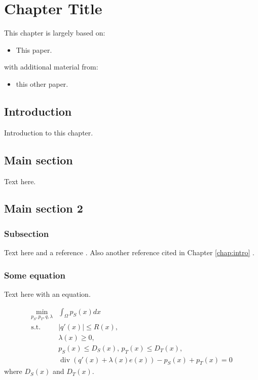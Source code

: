 \chapter{Chapter Title}\label{chap:example}

This chapter is largely based on:
\begin{itemize}[noitemsep,topsep=0pt]
	\item This paper.
\end{itemize}
with additional material from:
\begin{itemize}[noitemsep,topsep=0pt]
	\item this other paper.
\end{itemize}

\section{Introduction}
Introduction to this chapter.

\section{Main section}

Text here.

\section{Main section 2}
\subsection{Subsection}

Text here and a reference \cite{Author2018}. Also another reference cited in Chapter \ref{chap:intro} \cite{Author1990}.

\subsection{Some equation}

Text here with an equation.

\begin{equation}
\begin{aligned}
\underset{p_S,p_T,q,\lambda} \min & \int_\Omega p_S(x)dx \\
\text{s.t. } & |q'(x)| \leq R(x) , \\
\text{ } & \lambda(x) \geq 0, \\
\text{ } & p_S(x) \leq D_S(x), \, p_T(x) \leq D_T(x), \\
\text{ } & \operatorname{div}\left( q'(x) + \lambda(x)e(x) \right) - p_S(x) + p_T(x) = 0
\label{eq:jingOpt}
\end{aligned}
\end{equation}
where $D_S(x)$ and $D_T(x)$.
